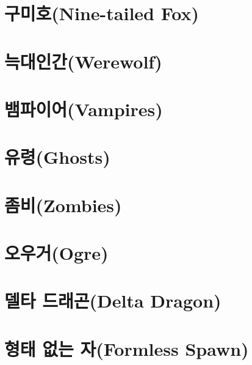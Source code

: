 \documentclass{report}
\begin{document}
	\section{구미호(Nine-tailed Fox)}
		
	
	\section{늑대인간(Werewolf)}
		
	
	\section{뱀파이어(Vampires)}
		
	
	\section{유령(Ghosts)}
		
	
	\section{좀비(Zombies)}
		
	
	\section{오우거(Ogre)}
		
	
	\section{델타 드래곤(Delta Dragon)}
		
	
	\section{형태 없는 자(Formless Spawn)}
		
\end{document}
